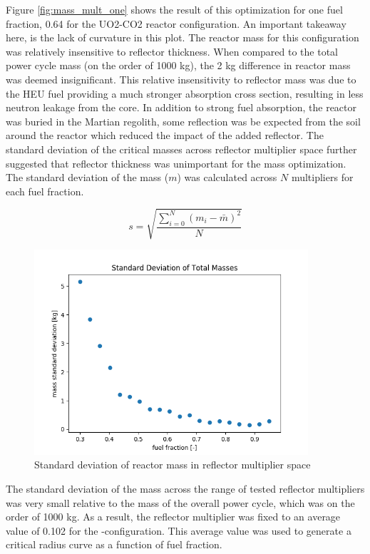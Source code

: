 Figure \ref{fig:mass_mult_one} shows the result of this optimization for one
fuel fraction, 0.64 for the UO2-CO2 reactor configuration. An important takeaway 
here, is the lack of curvature in this plot. The reactor mass for this 
configuration was relatively insensitive to reflector thickness. When compared to 
the total power cycle mass (on the order of 1000 kg), the 2 kg difference in reactor 
mass was deemed insignificant. This relative insensitivity to reflector mass was due
to the HEU fuel providing a much stronger absorption cross section, 
resulting in less neutron leakage from the core. In addition to strong fuel absorption, 
the reactor was buried in the Martian regolith, some reflection was be expected from 
the soil around the reactor which reduced the impact of the added reflector.
The standard deviation of the critical masses across reflector multiplier space
further suggested that reflector thickness was unimportant for the mass
optimization. The standard deviation of the mass ($m$) was calculated across $N$
multipliers for each fuel fraction.

\begin{equation}
    s = \sqrt{\frac{\sum_{i=0}^{N}(m_i - \bar{m})^2 }{N}}
\end{equation}

\begin{figure}[h]
    \centering
    \includegraphics[width=4in]{../images/mass_std_uo2_co2.png}
\caption{Standard deviation of reactor mass in reflector multiplier space}
\label{fig:mass_std_co2_uo2}
\end{figure}

The standard deviation of the mass across the range of tested reflector
multipliers was very small relative to the mass of the overall power cycle,
which was on the order of 1000 kg. As a result, the reflector multiplier was fixed to an
average value of 0.102 for the \uox-\codiox configuration. 
This average value was used to generate a critical radius
curve as a function of fuel fraction. 

